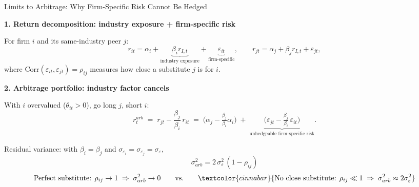 
\begin{frame}{Limits to Arbitrage: Why Firm-Specific Risk Cannot Be Hedged}


\small

\textbf{\textcolor{inkblue}{1. Return decomposition: industry exposure + firm-specific risk}}
\vspace{0.4em}

For firm $i$ and its same-industry peer $j$:
\[
r_{it} = \alpha_i + \underbrace{\beta_i r_{I,t}}_{\text{industry exposure}} + \underbrace{\varepsilon_{it}}_{\text{firm-specific}}, \qquad
r_{jt} = \alpha_j + \beta_j r_{I,t} + \varepsilon_{jt},
\]
where $\mathrm{Corr}(\varepsilon_{it},\varepsilon_{jt}) = \rho_{ij}$ measures how close a substitute $j$ is for $i$.

\vspace{0.6em}

\textbf{\textcolor{inkblue}{2. Arbitrage portfolio: industry factor cancels}}
\vspace{0.4em}

With $i$ overvalued ($\theta_{it} > 0$), go long $j$, short $i$:
\[
r^{arb}_t \;=\; r_{jt} - \frac{\beta_j}{\beta_i}\, r_{it}
\;=\; \Big(\alpha_j - \tfrac{\beta_j}{\beta_i}\alpha_i\Big) \;+\;
\underbrace{\Big(\varepsilon_{jt} - \tfrac{\beta_j}{\beta_i}\,\varepsilon_{it}\Big)}_{\text{unhedgeable firm-specific risk}} .
\]

\vspace{0.4em}

Residual variance: with $\beta_i = \beta_j$ and $\sigma_{\varepsilon_i}=\sigma_{\varepsilon_j}=\sigma_\varepsilon$,
\[
\boxed{\; \sigma^2_{arb} = 2\,\sigma_\varepsilon^2\,(1-\rho_{ij}) \;}
\]
\[
\text{Perfect substitute: } \rho_{ij} \to 1 \;\Rightarrow\; \sigma^2_{arb} \to 0
\qquad \text{vs.} \qquad
\textcolor{cinnabar}{\text{No close substitute: } \rho_{ij} \ll 1 \;\Rightarrow\; \sigma^2_{arb} \approx 2\sigma_\varepsilon^2}
\]

\vspace{0.4em}


\end{frame}
